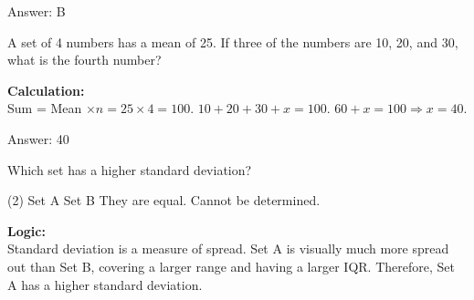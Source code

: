 \documentclass[11pt,paper=a4,answers]{exam}
\begin{document}
\begin{questions}
\begin{solution}
Answer: \colorbox{yellow!100}{B}
\end{solution}

\vspace{60pt}

\question
A set of 4 numbers has a mean of 25. If three of the numbers are 10, 20, and 30, what is the fourth number?

\begin{solution}
\textbf{Calculation:} \\
Sum = Mean $\times n = 25 \times 4 = 100$. 
$10 + 20 + 30 + x = 100$. 
$60 + x = 100 \Rightarrow x = 40$.

\vspace{30pt}

Answer: \colorbox{yellow!100}{40}
\end{solution}

\vspace{60pt}

\question
\begin{center}
\end{center}
Which set has a higher standard deviation?
\begin{tasks}(2)
    \task Set A
    \task Set B
    \task They are equal.
    \task Cannot be determined.
\end{tasks}

\begin{solution}
\textbf{Logic:} \\
Standard deviation is a measure of spread. Set A is visually much more spread out than Set B, covering a larger range and having a larger IQR. Therefore, Set A has a higher standard deviation.

\vspace{30pt}


\end{solution}
\end{questions}
\end{document}
